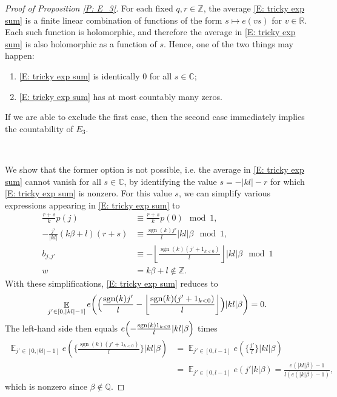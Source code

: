 \documentclass[11pt]{amsart}
\theoremstyle{definition}
\DeclareMathOperator*{\E}{\mathbb{E}}
\newcommand{\C}{{\mathbb C}}
\newcommand{\Q}{{\mathbb Q}}
\newcommand{\R}{{\mathbb R}}
\newcommand{\Z}{{\mathbb Z}}
\newcommand{\1}{{\mathbf{1}}}
\DeclareMathOperator{\sgn}{sgn}
\newcommand{\brac}[1]{\mathopen{}\left( #1 \mathclose{}\right)}
\newcommand{\Bigbrac}[1]{\Bigl( #1 \Bigr)}
\newcommand{\floor}[1]{{\left \lfloor #1 \right \rfloor}}
\begin{document}
\begin{proof}[Proof of Proposition \ref{P: E_3}]
For each fixed $q,r\in\mathbb{Z}$, the average \eqref{E: tricky exp sum} is a finite linear combination of functions of the form $s\mapsto e(v s)$ for $v\in\R$. 
Each such function is holomorphic, and therefore the average in \eqref{E: tricky exp sum} is also holomorphic as a function of $s$. Hence, one of the two things may happen:
\begin{enumerate}
    \item \eqref{E: tricky exp sum} is identically 0 for all $s\in\C$;
    \item \eqref{E: tricky exp sum} has at most countably many zeros.
\end{enumerate}
If we are able to exclude the first case, then the second case immediately implies the countability of $E_3$.

\ 

We show that the former option is not possible, i.e. the average in \eqref{E: tricky exp sum} cannot vanish for all $s\in\C$, by identifying the value $s=-|kl|-r$ for which \eqref{E: tricky exp sum} is nonzero.
For this value $s$, we can simplify various expressions appearing in \eqref{E: tricky exp sum} to
\begin{align*}
        \frac{r+s}{k}p(j) &\equiv \frac{r+s}{k}p(0)\!\!\!\mod 1,\\
        -\frac{j'}{|kl|}(k\beta + l)(r+s) &\equiv \frac{\sgn(k)j'}{l}|kl|\beta\!\!\!\mod 1,\\
        b_{j,j'}&\equiv -\floor{\frac{\sgn(k)(j' +1_{k<0})}{l}}|kl|\beta\!\!\!\mod 1\\
        w &= k\beta + l\notin\Z.
\end{align*}
With these simplifications, \eqref{E: tricky exp sum} reduces to
\begin{align*}
    \E_{j'\in [0,|kl|-1]}
    e\brac{\Bigbrac{\frac{\sgn(k)j'}{l}-\floor{\frac{\sgn(k)(j' +1_{k<0})}{l}}}|kl|\beta} = 0.
\end{align*}
The left-hand side then equals  $e\Bigbrac{-\frac{\sgn(k)1_{k<0}}{l}|kl|\beta}$ times  
\begin{align*}
    \E_{j'\in [0,|kl|-1]}
    e\brac{\Big\{\frac{\sgn(k)(j'+1_{k<0})}{l}\Big\}|kl|\beta} &= \E_{j'\in [0,l-1]}
    e\brac{\Big\{\frac{j'}{l}\Big\}|kl|\beta}\\ &= \E_{j'\in [0,l-1]}e(j'|k|\beta) =\frac{e(|kl|\beta)-1}{l(e(|k|\beta)-1)},
\end{align*}
which is nonzero since $\beta\notin\Q$.
 \end{proof}
\end{document}
